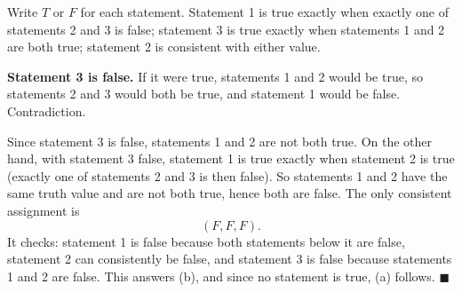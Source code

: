 Write $T$ or $F$ for each statement. Statement 1 is true exactly when exactly one of statements 2 and 3 is false; statement 3 is true exactly when statements 1 and 2 are both true; statement 2 is consistent with either value.

\textbf{Statement 3 is false.} If it were true, statements 1 and 2 would be true, so statements 2 and 3 would both be true, and statement 1 would be false. Contradiction.

Since statement 3 is false, statements 1 and 2 are not both true. On the other hand, with statement 3 false, statement 1 is true exactly when statement 2 is true (exactly one of statements 2 and 3 is then false). So statements 1 and 2 have the same truth value and are not both true, hence both are false. The only consistent assignment is
\[\boxed{(F,F,F)}.\]
It checks: statement 1 is false because both statements below it are false, statement 2 can consistently be false, and statement 3 is false because statements 1 and 2 are false. This answers (b), and since no statement is true, (a) follows. $\blacksquare$
